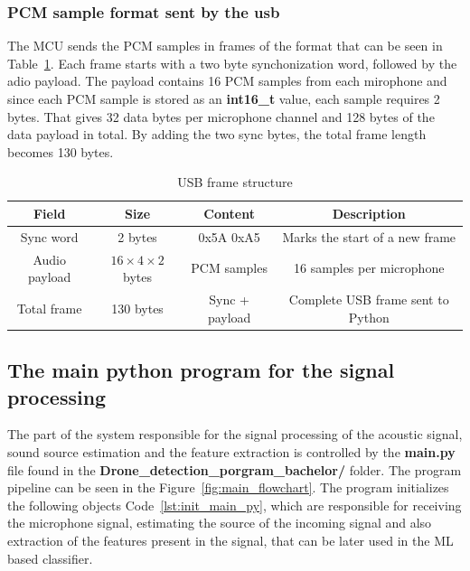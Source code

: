     
    \newpage
    \subsubsection{PCM sample format sent by the usb}
        \label{sec:PCM_sample_format_sent_by_usb}
        The MCU sends the PCM samples in frames of the format that can be seen in Table~\ref{tab:usb_frame_structure}. Each frame starts with a two byte synchonization word, followed  by the adio payload. The payload contains 16 PCM samples from each mirophone and since each PCM sample is stored as an \textbf{int16\_t} value, each sample requires 2 bytes. That gives 32 data bytes per microphone channel and 128 bytes of the data payload in total. By adding the two sync bytes, the total frame length becomes 130 bytes. 
        
\begin{table}[h]
\centering
\caption{USB frame structure}
\label{tab:usb_frame_structure}
\begin{tabular}{|c|c|c|c|}
\hline
\textbf{Field} & \textbf{Size} & \textbf{Content} & \textbf{Description} \\
\hline
Sync word & 2 bytes & 0x5A 0xA5 & Marks the start of a new frame \\
\hline
Audio payload & $16 \times 4 \times 2$ bytes & PCM samples & 16 samples per microphone \\
\hline
Total frame & 130 bytes & Sync + payload & Complete USB frame sent to Python \\
\hline
\end{tabular}
\end{table}

\subsection{The main python program for the signal processing}
The part of the system responsible for the signal processing of the acoustic signal, sound source estimation and the feature extraction is controlled by the \textbf{main.py} file found in the \textbf{Drone\_detection\_porgram\_bachelor/} folder. The program pipeline can be seen in the Figure~\ref{fig:main_flowchart}. The program initializes the following objects Code~\ref{lst:init_main_py}, which are responsible for receiving the microphone signal, estimating the source of the incoming signal and also extraction of the features present in the signal, that can be later used in the ML based classifier.

